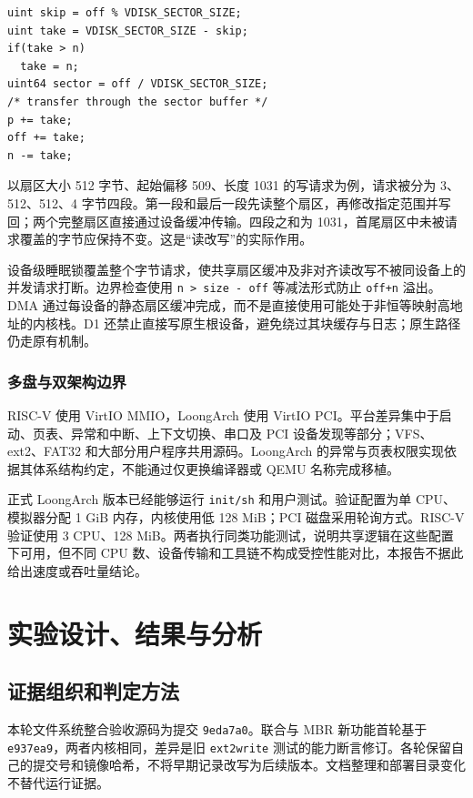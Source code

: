 \documentclass[conference]{IEEEtran}
\newcommand{\code}[1]{\texttt{#1}}
\begin{document}
\begin{lstlisting}[float=tb,caption={D1 请求切分与进度推进（节选自 kernel/blkdev.c，省略传输分支）},label={lst:d1}]
uint skip = off % VDISK_SECTOR_SIZE;
uint take = VDISK_SECTOR_SIZE - skip;
if(take > n)
  take = n;
uint64 sector = off / VDISK_SECTOR_SIZE;
/* transfer through the sector buffer */
p += take;
off += take;
n -= take;
\end{lstlisting}

以扇区大小 512 字节、起始偏移 509、长度 1031 的写请求为例，请求被分为 3、512、512、4 字节四段。第一段和最后一段先读整个扇区，再修改指定范围并写回；两个完整扇区直接通过设备缓冲传输。四段之和为 1031，首尾扇区中未被请求覆盖的字节应保持不变。这是“读改写”的实际作用。

设备级睡眠锁覆盖整个字节请求，使共享扇区缓冲及非对齐读改写不被同设备上的并发请求打断。边界检查使用 \code{n > size - off} 等减法形式防止 \code{off+n} 溢出。DMA 通过每设备的静态扇区缓冲完成，而不是直接使用可能处于非恒等映射高地址的内核栈。D1 还禁止直接写原生根设备，避免绕过其块缓存与日志；原生路径仍走原有机制。

\subsubsection{多盘与双架构边界}
RISC-V 使用 VirtIO MMIO，LoongArch 使用 VirtIO PCI。平台差异集中于启动、页表、异常和中断、上下文切换、串口及 PCI 设备发现等部分；VFS、ext2、FAT32 和大部分用户程序共用源码。LoongArch 的异常与页表权限实现依据其体系结构约定，不能通过仅更换编译器或 QEMU 名称完成移植。

正式 LoongArch 版本已经能够运行 \code{init/sh} 和用户测试。验证配置为单 CPU、模拟器分配 1 GiB 内存，内核使用低 128 MiB；PCI 磁盘采用轮询方式。RISC-V 验证使用 3 CPU、128 MiB。两者执行同类功能测试，说明共享逻辑在这些配置下可用，但不同 CPU 数、设备传输和工具链不构成受控性能对比，本报告不据此给出速度或吞吐量结论。

\section{实验设计、结果与分析}
\subsection{证据组织和判定方法}
本轮文件系统整合验收源码为提交 \code{9eda7a0}。联合与 MBR 新功能首轮基于 \code{e937ea9}，两者内核相同，差异是旧 \code{ext2write} 测试的能力断言修订。各轮保留自己的提交号和镜像哈希，不将早期记录改写为后续版本。文档整理和部署目录变化不替代运行证据。
\end{document}
